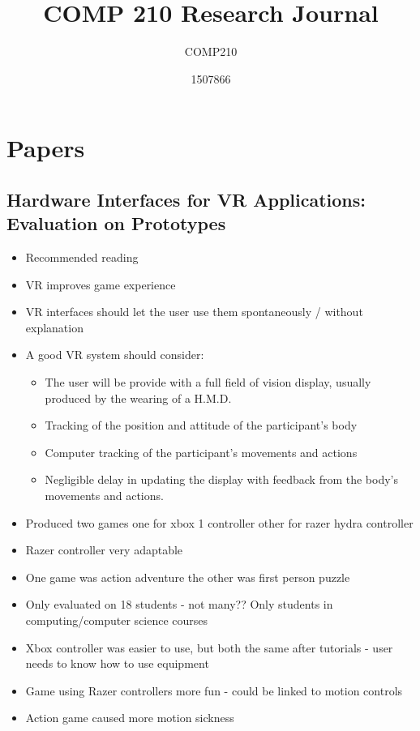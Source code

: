 \documentclass{scrartcl}
\title{COMP 210 Research Journal}
\subtitle{COMP210}
\author{1507866}
\begin{document}
	
\maketitle
	
\abstract{}
	
\section{Papers}

\subsection{Hardware Interfaces for VR Applications: Evaluation on Prototypes \cite{Mentzelopoulos}}

\begin{itemize}
	\item Recommended reading 	
	\item VR improves game experience 
	\item VR interfaces should let the user use them spontaneously / without explanation
	\item A good VR system should consider:
		\begin{itemize}
			\item  The user will be provide with a full field of vision display, usually produced by the wearing of a H.M.D.
			\item Tracking of the position and attitude of the participant's body
			\item Computer tracking of the participant's movements and actions
			\item Negligible delay in updating the display with feedback from the body's movements and actions.
		\end{itemize}
	\item Produced two games one for xbox 1 controller other for razer hydra controller
	\item Razer controller very adaptable 
	\item One game was action adventure the other was first person puzzle
	\item Only evaluated on 18 students - not many??  Only students in computing/computer science courses
	\item Xbox controller was easier to use, but both the same after tutorials - user needs to know how to use equipment
	\item Game using Razer controllers more fun - could be linked to motion controls
	\item Action game caused more motion sickness  		
	
\end{itemize}
\end{document}
